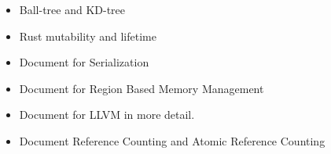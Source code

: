 \begin{itemize}
    \item Ball-tree and KD-tree
    \item Rust mutability and lifetime
    \item Document for Serialization
    \item Document for Region Based Memory Management
    \item Document for LLVM in more detail.
    \item Document Reference Counting and Atomic Reference Counting
\end{itemize}